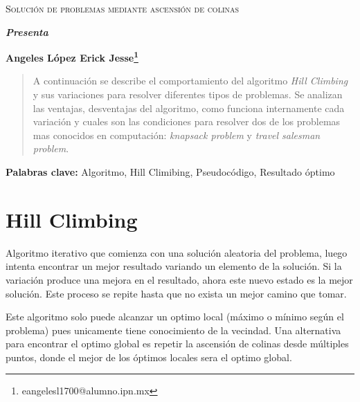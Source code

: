 \documentclass[12pt,twoside]{article}
\newcommand{\keywords}[1]{%
	\begin{center}
		\textbf{Palabras clave:} #1
	\end{center}
}
\begin{document}
	\centerline{}
	
	
	
	\begin{center}
		\Large{\textsc{Solución de problemas mediante ascensión de colinas}} 
	\end{center}
	\centerline{}
	\centerline{\bf {\textit{Presenta}}}
	\centerline{}
	\centerline{\bf {Angeles López Erick Jesse\footnote{eangelesl1700@alumno.ipn.mx}}}
	
	
	
	\newtheorem{Theorem}{\quad Theorem}[section]
	
	\newtheorem{Definition}[Theorem]{\quad Definition}
	
	\newtheorem{Corollary}[Theorem]{\quad Corollary}
	
	\newtheorem{Lemma}[Theorem]{\quad Lemma}
	
	\newtheorem{Example}[Theorem]{\quad Example}
	
	\bigskip
	
	\bigskip
	
	\begin{abstract} 
		A continuación se describe el comportamiento del algoritmo \textit{Hill Climbing} y sus variaciones para resolver diferentes tipos de problemas. Se analizan las ventajas, desventajas del algoritmo, como funciona internamente cada variación y cuales son las condiciones para resolver dos de los problemas mas conocidos en computación: \textit{knapsack problem} y \textit{travel salesman problem}.
	\end{abstract}
	
	\keywords{Algoritmo, Hill Climibing, Pseudocódigo, Resultado óptimo}
	
	\clearpage
	
	\tableofcontents
	\clearpage
		
	\section{Hill Climbing}
	
	Algoritmo iterativo que comienza con una solución aleatoria del problema, luego intenta encontrar un mejor resultado variando un elemento de la solución. Si la variación produce una mejora en el resultado, ahora este nuevo estado es la mejor solución. Este proceso se repite hasta que no exista un mejor camino que tomar.
	 
	Este algoritmo solo puede alcanzar un optimo local (máximo o mínimo según el problema) pues unicamente tiene conocimiento de la vecindad. Una alternativa para encontrar el optimo global es repetir la ascensión de colinas desde múltiples puntos, donde el mejor de los óptimos locales sera el optimo global.
	
\end{document}
